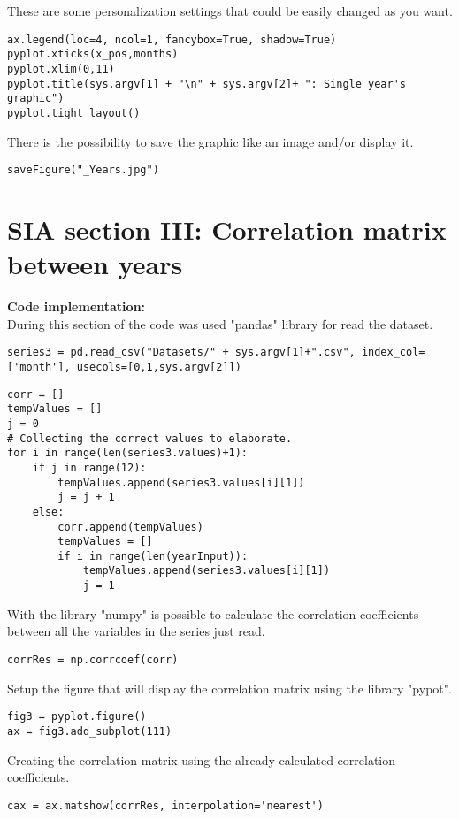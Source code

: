 These are some personalization settings that could be easily changed as you want.
\begin{lstlisting}
ax.legend(loc=4, ncol=1, fancybox=True, shadow=True)
pyplot.xticks(x_pos,months)
pyplot.xlim(0,11)
pyplot.title(sys.argv[1] + "\n" + sys.argv[2]+ ": Single year's graphic")
pyplot.tight_layout()
\end{lstlisting}

There is the possibility to save the graphic like an image and/or display it.
\begin{lstlisting}
saveFigure("_Years.jpg")
\end{lstlisting}


\section{SIA section III: Correlation matrix between years}
\label{SIA_section_III}
\textbf{Code implementation:}\\
During this section of the code was used "pandas" library for read the dataset.
\begin{lstlisting}
series3 = pd.read_csv("Datasets/" + sys.argv[1]+".csv", index_col=['month'], usecols=[0,1,sys.argv[2]])
\end{lstlisting}

\begin{lstlisting}
corr = []
tempValues = []
j = 0
# Collecting the correct values to elaborate.
for i in range(len(series3.values)+1):
	if j in range(12):
		tempValues.append(series3.values[i][1])
		j = j + 1
	else:
		corr.append(tempValues)
		tempValues = []
		if i in range(len(yearInput)):
			tempValues.append(series3.values[i][1])
			j = 1
\end{lstlisting}

With the library "numpy" is possible to calculate the correlation coefficients between all the variables in the series just read.
\begin{lstlisting}
corrRes = np.corrcoef(corr)
\end{lstlisting}

Setup the figure that will display the correlation matrix using the library "pypot".
\begin{lstlisting}
fig3 = pyplot.figure()
ax = fig3.add_subplot(111)
\end{lstlisting}

Creating the correlation matrix using the already calculated correlation coefficients.
\begin{lstlisting}
cax = ax.matshow(corrRes, interpolation='nearest')
\end{lstlisting}

